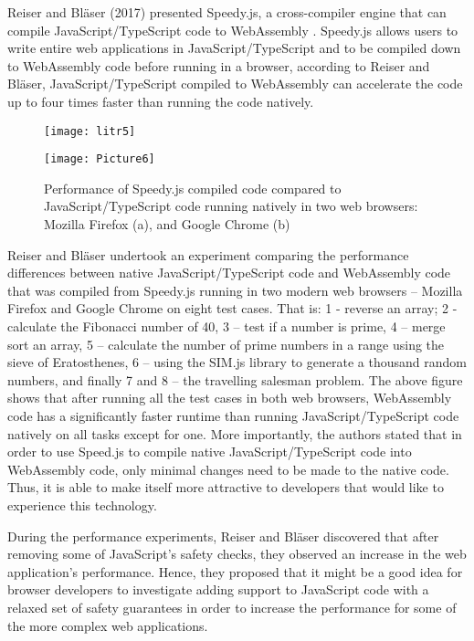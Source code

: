Reiser and Bläser (2017) presented Speedy.js, a cross-compiler engine that can compile JavaScript/TypeScript code to WebAssembly \cite{lit14}. Speedy.js allows users to write entire web applications in JavaScript/TypeScript and to be compiled down to WebAssembly code before running in a browser, according to Reiser and Bläser, JavaScript/TypeScript compiled to WebAssembly can accelerate the code up to four times faster than running the code natively.

\bigskip
\begin{figure}[hp]
\centering
\texttt{[image: litr5]}
\captionsetup{aboveskip=0pt,font=it}
\end{figure}
\bigskip

\newpage
\bigskip
\begin{figure}[hp]
\centering
\texttt{[image: Picture6]}
\caption{\footnotesize{Performance of Speedy.js compiled code compared to JavaScript/TypeScript code running natively in two web browsers: Mozilla Firefox (a), and Google Chrome (b) \cite{lit14}}}
\captionsetup{aboveskip=0pt,font=it}
\end{figure}
\bigskip

Reiser and Bläser undertook an experiment comparing the performance differences between native JavaScript/TypeScript code and WebAssembly code that was compiled from Speedy.js running in two modern web browsers – Mozilla Firefox and Google Chrome on eight test cases. That is: 1 - reverse an array; 2 - calculate the Fibonacci number of 40, 3 – test if a number is prime, 4 – merge sort an array, 5 – calculate the number of prime numbers in a range using the sieve of Eratosthenes, 6 – using the SIM.js library to generate a thousand random numbers, and finally 7 and 8 – the travelling salesman problem. The above figure shows that after running all the test cases in both web browsers, WebAssembly code has a significantly faster runtime than running JavaScript/TypeScript code natively on all tasks except for one. More importantly, the authors stated that in order to use Speed.js to compile native JavaScript/TypeScript code into WebAssembly code, only minimal changes need to be made to the native code. Thus, it is able to make itself more attractive to developers that would like to experience this technology.

During the performance experiments, Reiser and Bläser discovered that after removing some of JavaScript’s safety checks, they observed an increase in the web application’s performance. Hence, they proposed that it might be a good idea for browser developers to investigate adding support to JavaScript code with a relaxed set of safety guarantees in order to increase the performance for some of the more complex web applications.

